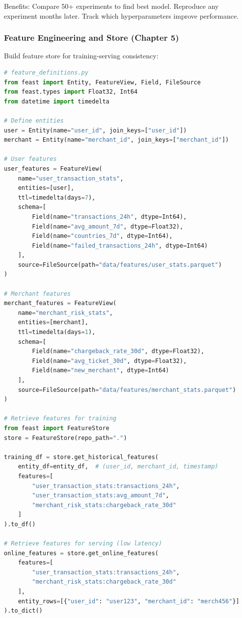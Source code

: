 Benefits: Compare 50+ experiments to find best model. Reproduce any experiment months later. Track which hyperparameters improve performance.

\subsubsection{Feature Engineering and Store (Chapter 5)}

Build feature store for training-serving consistency:

\begin{lstlisting}[language=Python, caption={Feature Store with Feast}]
# feature_definitions.py
from feast import Entity, FeatureView, Field, FileSource
from feast.types import Float32, Int64
from datetime import timedelta

# Define entities
user = Entity(name="user_id", join_keys=["user_id"])
merchant = Entity(name="merchant_id", join_keys=["merchant_id"])

# User features
user_features = FeatureView(
    name="user_transaction_stats",
    entities=[user],
    ttl=timedelta(days=7),
    schema=[
        Field(name="transactions_24h", dtype=Int64),
        Field(name="avg_amount_7d", dtype=Float32),
        Field(name="countries_7d", dtype=Int64),
        Field(name="failed_transactions_24h", dtype=Int64)
    ],
    source=FileSource(path="data/features/user_stats.parquet")
)

# Merchant features
merchant_features = FeatureView(
    name="merchant_risk_stats",
    entities=[merchant],
    ttl=timedelta(days=1),
    schema=[
        Field(name="chargeback_rate_30d", dtype=Float32),
        Field(name="avg_ticket_30d", dtype=Float32),
        Field(name="new_merchant", dtype=Int64)
    ],
    source=FileSource(path="data/features/merchant_stats.parquet")
)

# Retrieve features for training
from feast import FeatureStore
store = FeatureStore(repo_path=".")

training_df = store.get_historical_features(
    entity_df=entity_df,  # (user_id, merchant_id, timestamp)
    features=[
        "user_transaction_stats:transactions_24h",
        "user_transaction_stats:avg_amount_7d",
        "merchant_risk_stats:chargeback_rate_30d"
    ]
).to_df()

# Retrieve features for serving (low latency)
online_features = store.get_online_features(
    features=[
        "user_transaction_stats:transactions_24h",
        "merchant_risk_stats:chargeback_rate_30d"
    ],
    entity_rows=[{"user_id": "user123", "merchant_id": "merch456"}]
).to_dict()
\end{lstlisting}

